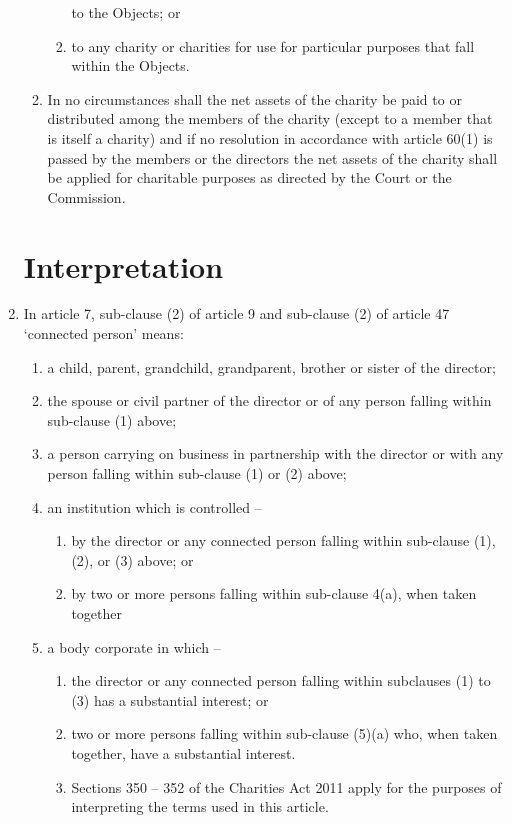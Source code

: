 \documentclass{article}
\begin{document}
\begin{enumerate}[label=\arabic*, start=23]
\begin{enumerate}[label=(\arabic*)]
\begin{enumerate}[label=(\alph*)]
            to the Objects; or
            \item to any charity or charities for use for particular purposes
            that fall within the Objects.
        \end{enumerate}
        \item In no circumstances shall the net assets of the charity be paid
        to or distributed among the members of the charity (except
        to a member that is itself a charity) and if no resolution in
        accordance with article 60(1) is passed by the members or
        the directors the net assets of the charity shall be applied for
        charitable purposes as directed by the Court or the Commission.
    \end{enumerate}
    
    \section{Interpretation}
    \item In article 7, sub-clause (2) of article 9 and sub-clause (2) of article 47
    ‘connected person’ means:
    \begin{enumerate}[label=(\arabic*)]
        \item a child, parent, grandchild, grandparent, brother or sister of
        the director;
        \item the spouse or civil partner of the director or of any person
        falling within sub-clause (1) above;
        \item a person carrying on business in partnership with the director or
        with any person falling within sub-clause (1) or (2) above;
        \item an institution which is controlled –
        \begin{enumerate}[label=(\alph*)]
            \item by the director or any connected person falling within
            sub-clause (1), (2), or (3) above; or
            \item by two or more persons falling within sub-clause 4(a),
            when taken together
        \end{enumerate}
        \item a body corporate in which –
        \begin{enumerate}[label=(\alph*)]
            \item the director or any connected person falling within subclauses (1) to (3) has a substantial interest; or
            \item two or more persons falling within sub-clause (5)(a) who,
            when taken together, have a substantial interest.
            \item Sections 350 – 352 of the Charities Act 2011 apply for the
            purposes of interpreting the terms used in this article.
        \end{enumerate}
    \end{enumerate}
\end{enumerate}
\end{document}
